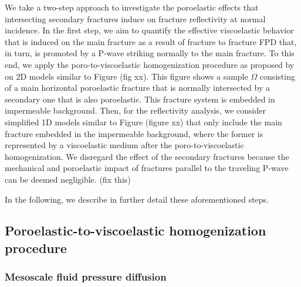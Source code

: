 \documentclass[draft]{agujournal2019}
\begin{document}
We take a two-step approach
to investigate the poroelastic effects that intersecting secondary fractures induce on fracture reflectivity at normal incidence. In the first step, we aim to quantify the effective viscoelastic behavior that is induced on the main fracture as a result of fracture to fracture FPD that, in turn, is promoted by a P-wave striking normally to the main fracture. To this end, we apply the  poro-to-viscoelastic homogenization procedure as proposed by  on 2D models similar to Figure (fig xx). This figure shows a sample $\Omega$ consisting of a main horizontal poroelastic fracture that is normally intersected by a secondary one that is also poroelastic. This fracture system is embedded in impermeable background. Then, for the reflectivity analysis, we consider simplified 1D models similar to Figure (figure xx) that only include the main fracture embedded in the  impermeable background, where the former is represented by a viscoelastic medium after the poro-to-viscoelastic homogenization. We disregard the effect of the secondary fractures because the mechanical and poroelastic impact of fractures parallel to the traveling P-wave can be deemed negligible. (fix this)

In the following, we describe in further detail these aforementioned steps.


\subsection{Poroelastic-to-viscoelastic homogenization procedure}

\subsubsection{Mesoscale fluid pressure diffusion}
\end{document}
